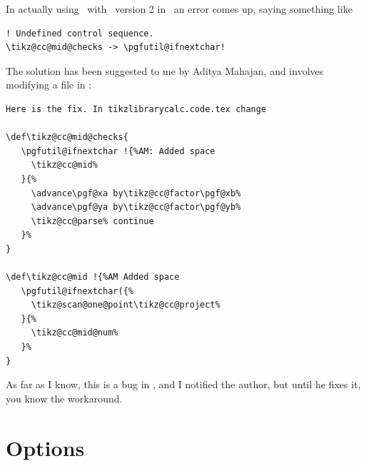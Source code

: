 \documentclass[a4paper]{article}
\begin{document}
\medskip

In actually using \Circuitikz\ with \TikZ\ version 2 in \ConTeXt\ an error comes up, saying something like
\begin{verbatim}
! Undefined control sequence.
\tikz@cc@mid@checks -> \pgfutil@ifnextchar!
\end{verbatim}


The solution has been suggested to me by Aditya Mahajan, and involves modifying a file in \TikZ:
\begin{verbatim}
Here is the fix. In tikzlibrarycalc.code.tex change

\def\tikz@cc@mid@checks{
   \pgfutil@ifnextchar !{%AM: Added space
     \tikz@cc@mid%
   }{%
     \advance\pgf@xa by\tikz@cc@factor\pgf@xb%
     \advance\pgf@ya by\tikz@cc@factor\pgf@yb%
     \tikz@cc@parse% continue
   }%
}

\def\tikz@cc@mid !{%AM Added space
   \pgfutil@ifnextchar({%
     \tikz@scan@one@point\tikz@cc@project%
   }{%
     \tikz@cc@mid@num%
   }%
}
\end{verbatim}

As far as I know, this is a bug in \TikZ, and I notified the author, but until he fixes it, you know the workaround.


\section{Options}
\end{document}
